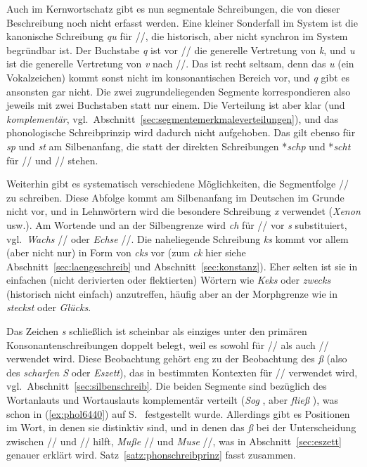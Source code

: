 Auch im Kernwortschatz gibt es nun segmentale Schreibungen, die von dieser Beschreibung noch nicht erfasst werden.
Eine kleiner Sonderfall im System ist die kanonische Schreibung \textit{qu} für //, die historisch, aber nicht synchron im System begründbar ist.
Der Buchstabe \textit{q} ist vor // die generelle Vertretung von \textit{k}, und \textit{u} ist die generelle Vertretung von \textit{v} nach //.
Das ist recht seltsam, denn das \textit{u} (ein Vokalzeichen) kommt sonst nicht im konsonantischen Bereich vor, und \textit{q} gibt es ansonsten gar nicht.
Die zwei zugrundeliegenden Segmente korrespondieren also jeweils mit zwei Buchstaben statt nur einem.
Die Verteilung ist aber klar (und \textit{komplementär}, vgl.\ Abschnitt~\ref{sec:segmentemerkmaleverteilungen}), und das phonologische Schreibprinzip wird dadurch nicht aufgehoben.
Das gilt ebenso für \textit{sp} und \textit{st} am Silbenanfang, die statt der direkten Schreibungen *\textit{schp} und *\textit{scht} für // und // stehen.

Weiterhin gibt es systematisch verschiedene Möglichkeiten, die Segmentfolge // zu schreiben.
Diese Abfolge kommt am Silbenanfang im Deutschen im Grunde nicht vor, und in Lehnwörtern wird die besondere Schreibung \textit{x} verwendet (\textit{Xenon} usw.).
Am Wortende und an der Silbengrenze wird \textit{ch} für // vor \textit{s} substituiert, vgl.\ \textit{Wachs} // oder \textit{Echse} //.
Die naheliegende Schreibung \textit{ks} kommt vor allem (aber nicht nur) in Form von \textit{cks} vor (zum \textit{ck} hier siehe Abschnitt~\ref{sec:laengeschreib} und Abschnitt~\ref{sec:konstanz}).
Eher selten ist sie in einfachen (nicht derivierten oder flektierten) Wörtern wie \textit{Keks} oder \textit{zwecks} (historisch nicht einfach) anzutreffen, häufig aber an der Morphgrenze wie in \textit{steckst} oder \textit{Glücks}.

Das Zeichen \textit{s} schließlich ist scheinbar als einziges unter den primären Konsonantenschreibungen doppelt belegt, weil es sowohl für // als auch // verwendet wird.
Diese Beobachtung gehört eng zu der Beobachtung des \textit{ß} (also des \textit{scharfen S} oder \textit{Eszett}), das in bestimmten Kontexten für // verwendet wird, vgl.\ Abschnitt~\ref{sec:silbenschreib}.
Die beiden Segmente sind bezüglich des Wortanlauts und Wortauslauts komplementär verteilt (\textit{Sog} \textipa{[zo:k]}, aber \textit{fließ} \textipa{[fli:s]}), was schon in (\ref{ex:phol6440}) auf S.~\pageref{ex:phol6440} festgestellt wurde.
Allerdings gibt es Positionen im Wort, in denen sie distinktiv sind, und in denen das \textit{ß} bei der Unterscheidung zwischen // und // hilft, \zB \textit{Muße} // und \textit{Muse} //, was in Abschnitt~\ref{sec:eszett} genauer erklärt wird.
Satz~\ref{satz:phonschreibprinz} fasst zusammen.

